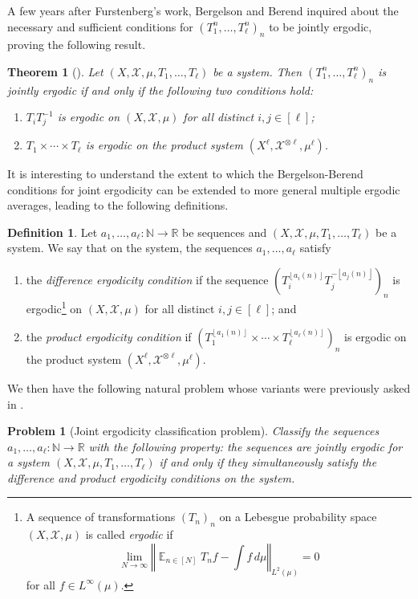 \documentclass[11pt]{amsart}
\newtheorem{theorem}[lemma]{Theorem}
\newtheorem{problem}[lemma]{Problem}
\theoremstyle{definition}
\newtheorem{definition}[lemma]{Definition}
\DeclareMathOperator*{\E}{\mathbb{E}}
\newcommand{\N}{{\mathbb N}}
\newcommand{\R}{{\mathbb R}}
\newcommand{\CX}{{\mathcal X}}
\newcommand{\norm}[1]{\left\Vert #1\right\Vert}
\newcommand{\1}{{\mathbf{1}}}
\newcommand{\floor}[1]{{\left \lfloor #1 \right \rfloor}}
\begin{document}
A few years after Furstenberg's work, Bergelson and Berend inquired about the necessary and sufficient conditions for $(T_1^n, \ldots, T_\ell^n)_n$ to be jointly ergodic, proving the following result.
\begin{theorem}[{\cite{BB84}}]
    Let $(X, \CX, \mu, T_1, \ldots, T_\ell)$ be a system. Then $(T_1^n, \ldots, T_\ell^n)_n$ is jointly ergodic if and only if the following two conditions hold:
    \begin{enumerate}
    \item $T_i T_j^{-1}$ is ergodic on $(X, \CX, \mu)$ for all distinct $i, j\in[\ell]$;
    \item $T_1\times \cdots \times T_\ell$ is ergodic on the product system $(X^\ell, \CX^{\otimes \ell}, \mu^\ell)$.
    \end{enumerate}
\end{theorem}
It is interesting to understand the extent to which the Bergelson-Berend conditions for joint ergodicity can be extended to more general multiple ergodic averages, leading to the following definitions. 
\begin{definition}\label{D: good for joint ergodicity}
    Let $a_1, \ldots, a_\ell:\N\to\R$ be sequences and $(X, \CX, \mu, T_1, \ldots, T_\ell)$ be a system. We say that on the system, the sequences $a_1, \ldots, a_\ell$ satisfy
    \begin{enumerate}
        \item\label{i: difference} the \emph{difference ergodicity condition} if the sequence $(T_i^{\floor{a_i(n)}}T_j^{-\floor{a_j(n)}})_n$ is ergodic\footnote{A sequence of transformations $(T_n)_n$ on a Lebesgue probability space $(X, \CX, \mu)$ is called \textit{ergodic} if
\[  \lim_{N\to\infty}\norm{\E_{n\in[N]} T_n f - \int f\, d\mu}_{L^2(\mu)} = 0    \]     
    for all $f\in L^\infty(\mu)$.} on $(X, \CX, \mu)$ for all distinct $i, j\in[\ell]$; and
        \item\label{i: product} the \emph{product ergodicity condition} if $(T_1^{\floor{a_1(n)}}\times \cdots \times T_\ell^{\floor{a_\ell(n)}})_n$ is ergodic on the product system $(X^\ell, \CX^{\otimes \ell}, \mu^\ell)$.
    \end{enumerate}
\end{definition}

We then have the following natural problem whose variants were previously asked in \cite{BMR20, DKS22, DKS23}.
    \begin{problem}[Joint ergodicity classification problem]\label{Pr: joint ergodicity problem}
    Classify the sequences $a_1, \ldots, a_\ell:\N\to\R$ with the following property: the sequences are jointly ergodic for a system $(X, \CX, \mu, T_1, \ldots, T_\ell)$ if and only if they simultaneously satisfy the difference and product ergodicity conditions on the system. 
    \end{problem}
\end{document}
